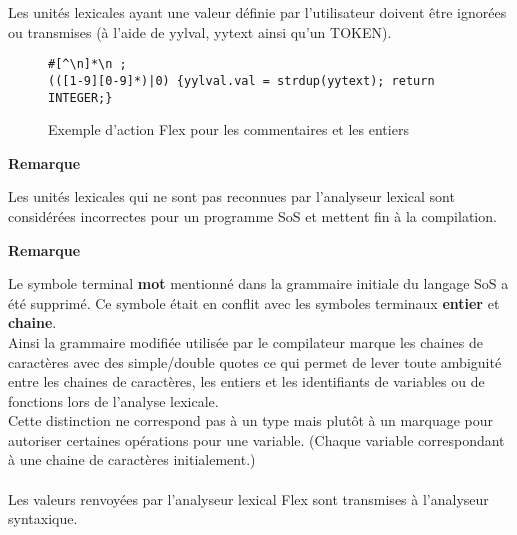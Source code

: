 Les unités lexicales ayant une valeur définie par l'utilisateur doivent être ignorées ou transmises (à l'aide de \textsf{yylval}, \textsf{yytext} ainsi qu'un TOKEN).
\begin{figure}[H]
\begin{lstlisting}
#[^\n]*\n ;
(([1-9][0-9]*)|0) {yylval.val = strdup(yytext); return INTEGER;}
\end{lstlisting}
\caption{Exemple d'action \textsf{Flex} pour les commentaires et les entiers}
\end{figure}

\noindent
\begin{minipage}[!hc]{0.12\textwidth}
   \textbf{Remarque}
\end{minipage}
\vrule\enskip\vrule\quad\begin{minipage}{\dimexpr 0.87\textwidth-0.8pt-1.5em}
Les unités lexicales qui ne sont pas reconnues par l'analyseur lexical sont considérées incorrectes pour un programme SoS et mettent fin à la compilation.
\end{minipage}

\noindent
\begin{minipage}[!hc]{0.12\textwidth}
   \textbf{Remarque}
\end{minipage}
\vrule\enskip\vrule\quad\begin{minipage}{\dimexpr 0.87\textwidth-0.8pt-1.5em}
Le symbole terminal \textbf{mot} mentionné dans la grammaire initiale du langage SoS a été supprimé. Ce symbole était en conflit avec les symboles terminaux \textbf{entier} et \textbf{chaine}.\\
Ainsi la grammaire modifiée utilisée par le compilateur marque les chaines de caractères avec des simple/double quotes ce qui permet de lever toute ambiguité entre les chaines de caractères, les entiers et les identifiants de variables ou de fonctions lors de l'analyse lexicale.\\
Cette distinction ne correspond pas à un type mais plutôt à un marquage pour autoriser certaines opérations pour une variable. (Chaque variable correspondant à une chaine de caractères initialement.)
\end{minipage}

\paragraph{}
Les valeurs renvoyées par l'analyseur lexical \textsf{Flex} sont transmises à l'analyseur syntaxique.